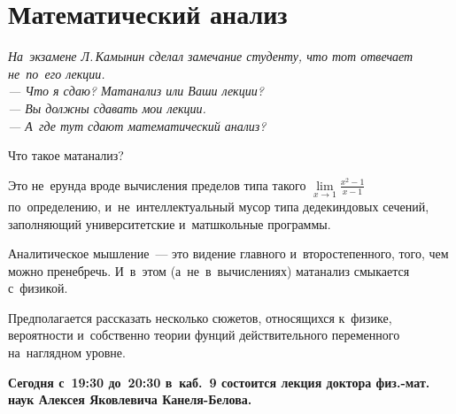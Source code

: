 
\section*{Математический анализ}



\leavevmode\hfill\begin{minipage}{0.45\linewidth} \em \small
На~экзамене Л.\,Камынин сделал замечание студенту, что тот отвечает не~по~его
лекции.
\\--- Что я сдаю? Матанализ или Ваши лекции?
\\--- Вы должны сдавать мои лекции.
\\--- А~где тут сдают математический анализ?
\end{minipage}

Что такое матанализ?

Это не~ерунда вроде вычисления пределов типа такого
$\lim\limits_{x \to 1} \frac{x^2 - 1}{x - 1}$
по~определению, и~не~интеллектуальный мусор типа дедекиндовых сечений,
заполняющий университетские и~матшкольные программы.

Аналитическое мышление~--- это видение главного и~второстепенного, того, чем
можно пренебречь.
И~в~этом (а~не~в~вычислениях) матанализ смыкается с~физикой.

Предполагается рассказать несколько сюжетов, относящихся к~физике, вероятности
и~собственно теории фунций действительного переменного на~наглядном
уровне.

\begingroup\bfseries\large
Сегодня с~19:30 до~20:30 в~каб.~9 состоится лекция
доктора физ.-мат. наук Алексея Яковлевича Канеля-Белова.
\endgroup

